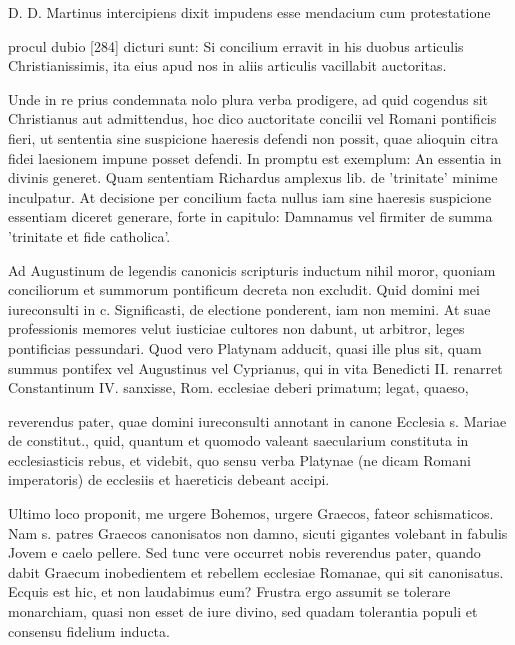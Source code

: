 D. D. Martinus intercipiens dixit impudens esse mendacium cum protestatione

procul dubio [284] dicturi sunt: Si concilium erravit in his duobus articulis Christianissimis, ita eius apud nos in aliis articulis vacillabit auctoritas.

Unde in re prius condemnata nolo plura verba prodigere, ad quid cogendus sit Christianus aut admittendus, hoc dico auctoritate concilii vel Romani pontificis fieri, ut sententia sine suspicione haeresis defendi non possit, quae alioquin citra fidei laesionem impune posset defendi. In promptu est exemplum: An essentia in divinis generet. Quam sententiam Richardus amplexus lib. de 'trinitate' minime inculpatur. At decisione per concilium facta nullus iam sine haeresis suspicione essentiam diceret generare, forte in capitulo: Damnamus vel firmiter de summa 'trinitate et fide catholica'.

Ad Augustinum de legendis canonicis scripturis inductum nihil moror, quoniam conciliorum et summorum pontificum decreta non excludit. Quid domini mei iureconsulti in c. Significasti, de electione ponderent, iam non memini. At suae professionis memores velut iusticiae cultores non dabunt, ut arbitror, leges pontificias pessundari. Quod vero Platynam adducit, quasi ille plus sit, quam summus pontifex vel Augustinus vel Cyprianus, qui in vita Benedicti II. renarret Constantinum IV. sanxisse, Rom. ecclesiae deberi primatum; legat, quaeso,

reverendus pater, quae domini iureconsulti annotant in canone Ecclesia s. Mariae de constitut., quid, quantum et quomodo valeant saecularium constituta in ecclesiasticis rebus, et videbit, quo sensu verba Platynae (ne dicam Romani imperatoris) de ecclesiis et haereticis debeant accipi.

Ultimo loco proponit, me urgere Bohemos, urgere Graecos, fateor schismaticos. Nam s. patres Graecos canonisatos non damno, sicuti gigantes volebant in fabulis Jovem e caelo pellere. Sed tunc vere occurret nobis reverendus pater, quando dabit Graecum inobedientem et rebellem ecclesiae Romanae, qui sit canonisatus. Ecquis est hic, et non laudabimus eum? Frustra ergo assumit se tolerare monarchiam, quasi non esset de iure divino, sed quadam tolerantia populi et consensu fidelium inducta.

